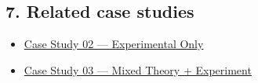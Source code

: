\documentclass[
  11pt,
]{article}
\providecommand{\tightlist}{
  \setlength{\itemsep}{0pt}\setlength{\parskip}{0pt}}
\begin{document}
\hypertarget{7-related-case-studies}{
\subsection{7. Related case studies}\label{7-related-case-studies}}

\begin{itemize}
\tightlist
\item
  \href{https://github.com/pinarsyt/overlap-calculator/blob/main/case_studies/02_experimental_only/README.md}{Case
  Study 02 --- Experimental Only}
\item
  \href{https://github.com/pinarsyt/overlap-calculator/blob/main/case_studies/03_mixed_theory_experiment/README.md}{Case
  Study 03 --- Mixed Theory + Experiment}
\end{itemize}
\end{document}
